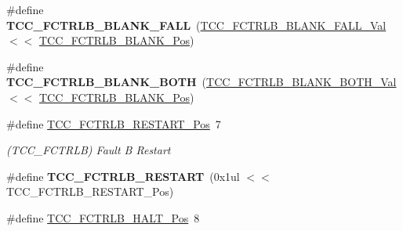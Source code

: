 \begin{DoxyCompactItemize}
\item 
\hypertarget{group___s_a_m_l21___t_c_c_gaa80b5d59e504b60fdfa2c25700cce7d1}{}\#define {\bfseries T\+C\+C\+\_\+\+F\+C\+T\+R\+L\+B\+\_\+\+B\+L\+A\+N\+K\+\_\+\+F\+A\+L\+L}~(\hyperlink{group___s_a_m_l21___t_c_c_gaeb2f63afa4b722c70140a0316f072ca2}{T\+C\+C\+\_\+\+F\+C\+T\+R\+L\+B\+\_\+\+B\+L\+A\+N\+K\+\_\+\+F\+A\+L\+L\+\_\+\+Val}     $<$$<$ \hyperlink{group___s_a_m_l21___t_c_c_ga43f50b938e3b7d7d9e7829e9550b855c}{T\+C\+C\+\_\+\+F\+C\+T\+R\+L\+B\+\_\+\+B\+L\+A\+N\+K\+\_\+\+Pos})\label{group___s_a_m_l21___t_c_c_gaa80b5d59e504b60fdfa2c25700cce7d1}

\item 
\hypertarget{group___s_a_m_l21___t_c_c_gaba38d71c919d6eea4e0084d51e91a2fd}{}\#define {\bfseries T\+C\+C\+\_\+\+F\+C\+T\+R\+L\+B\+\_\+\+B\+L\+A\+N\+K\+\_\+\+B\+O\+T\+H}~(\hyperlink{group___s_a_m_l21___t_c_c_ga0ff0915f1247161a5fab120d3260ad8b}{T\+C\+C\+\_\+\+F\+C\+T\+R\+L\+B\+\_\+\+B\+L\+A\+N\+K\+\_\+\+B\+O\+T\+H\+\_\+\+Val}     $<$$<$ \hyperlink{group___s_a_m_l21___t_c_c_ga43f50b938e3b7d7d9e7829e9550b855c}{T\+C\+C\+\_\+\+F\+C\+T\+R\+L\+B\+\_\+\+B\+L\+A\+N\+K\+\_\+\+Pos})\label{group___s_a_m_l21___t_c_c_gaba38d71c919d6eea4e0084d51e91a2fd}

\item 
\hypertarget{group___s_a_m_l21___t_c_c_ga7f8acb601fa8bed9ea372b1b7581e513}{}\#define \hyperlink{group___s_a_m_l21___t_c_c_ga7f8acb601fa8bed9ea372b1b7581e513}{T\+C\+C\+\_\+\+F\+C\+T\+R\+L\+B\+\_\+\+R\+E\+S\+T\+A\+R\+T\+\_\+\+Pos}~7\label{group___s_a_m_l21___t_c_c_ga7f8acb601fa8bed9ea372b1b7581e513}

\begin{DoxyCompactList}\small\item\em (T\+C\+C\+\_\+\+F\+C\+T\+R\+L\+B) Fault B Restart \end{DoxyCompactList}\item 
\hypertarget{group___s_a_m_l21___t_c_c_ga0a8ecd3f887dca231a132babcfc72a8e}{}\#define {\bfseries T\+C\+C\+\_\+\+F\+C\+T\+R\+L\+B\+\_\+\+R\+E\+S\+T\+A\+R\+T}~(0x1ul $<$$<$ T\+C\+C\+\_\+\+F\+C\+T\+R\+L\+B\+\_\+\+R\+E\+S\+T\+A\+R\+T\+\_\+\+Pos)\label{group___s_a_m_l21___t_c_c_ga0a8ecd3f887dca231a132babcfc72a8e}

\item 
\hypertarget{group___s_a_m_l21___t_c_c_gab9e9865f632211214654163efcbd704d}{}\#define \hyperlink{group___s_a_m_l21___t_c_c_gab9e9865f632211214654163efcbd704d}{T\+C\+C\+\_\+\+F\+C\+T\+R\+L\+B\+\_\+\+H\+A\+L\+T\+\_\+\+Pos}~8\label{group___s_a_m_l21___t_c_c_gab9e9865f632211214654163efcbd704d}


\end{DoxyCompactItemize}
